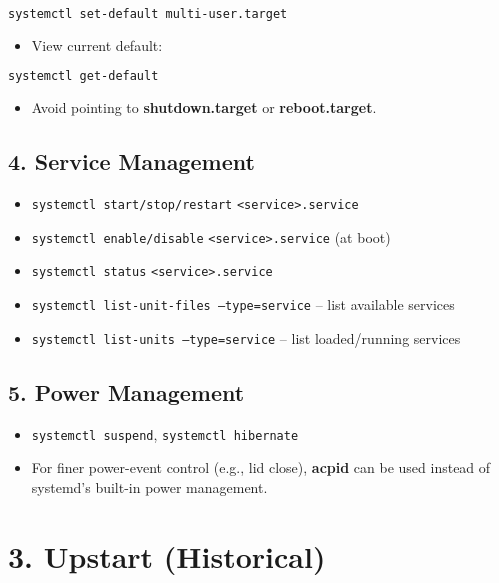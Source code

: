 \documentclass[a4paper]{report}
\begin{document}
\begin{lstlisting}[language=bash]
systemctl set-default multi-user.target
\end{lstlisting}

\begin{itemize}
    \item View current default:
\end{itemize}

\begin{lstlisting}[language=bash]
systemctl get-default
\end{lstlisting}

\begin{itemize}
    \item Avoid pointing to \textbf{shutdown.target} or \textbf{reboot.target}.
\end{itemize}

\subsection*{4. Service Management}
\begin{itemize}
    \item \texttt{systemctl start/stop/restart} \texttt{<service>.service}
    \item \texttt{systemctl enable/disable} \texttt{<service>.service} (at boot)
    \item \texttt{systemctl status} \texttt{<service>.service}
    \item \texttt{systemctl list-unit-files --type=service} – list available services
    \item \texttt{systemctl list-units --type=service} – list loaded/running services
\end{itemize}

\subsection*{5. Power Management}
\begin{itemize}
    \item \texttt{systemctl suspend}, \texttt{systemctl hibernate}
    \item For finer power-event control (e.g., lid close), \textbf{acpid} can be used instead of systemd’s built-in power management.
\end{itemize}

\section*{3. Upstart (Historical)}
\end{document}
